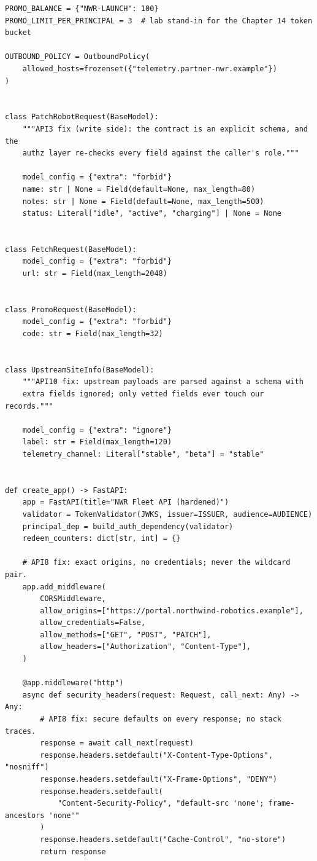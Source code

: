 \begin{verbatim}
PROMO_BALANCE = {"NWR-LAUNCH": 100}
PROMO_LIMIT_PER_PRINCIPAL = 3  # lab stand-in for the Chapter 14 token bucket

OUTBOUND_POLICY = OutboundPolicy(
    allowed_hosts=frozenset({"telemetry.partner-nwr.example"})
)


class PatchRobotRequest(BaseModel):
    """API3 fix (write side): the contract is an explicit schema, and the
    authz layer re-checks every field against the caller's role."""

    model_config = {"extra": "forbid"}
    name: str | None = Field(default=None, max_length=80)
    notes: str | None = Field(default=None, max_length=500)
    status: Literal["idle", "active", "charging"] | None = None


class FetchRequest(BaseModel):
    model_config = {"extra": "forbid"}
    url: str = Field(max_length=2048)


class PromoRequest(BaseModel):
    model_config = {"extra": "forbid"}
    code: str = Field(max_length=32)


class UpstreamSiteInfo(BaseModel):
    """API10 fix: upstream payloads are parsed against a schema with
    extra fields ignored; only vetted fields ever touch our records."""

    model_config = {"extra": "ignore"}
    label: str = Field(max_length=120)
    telemetry_channel: Literal["stable", "beta"] = "stable"


def create_app() -> FastAPI:
    app = FastAPI(title="NWR Fleet API (hardened)")
    validator = TokenValidator(JWKS, issuer=ISSUER, audience=AUDIENCE)
    principal_dep = build_auth_dependency(validator)
    redeem_counters: dict[str, int] = {}

    # API8 fix: exact origins, no credentials; never the wildcard pair.
    app.add_middleware(
        CORSMiddleware,
        allow_origins=["https://portal.northwind-robotics.example"],
        allow_credentials=False,
        allow_methods=["GET", "POST", "PATCH"],
        allow_headers=["Authorization", "Content-Type"],
    )

    @app.middleware("http")
    async def security_headers(request: Request, call_next: Any) -> Any:
        # API8 fix: secure defaults on every response; no stack traces.
        response = await call_next(request)
        response.headers.setdefault("X-Content-Type-Options", "nosniff")
        response.headers.setdefault("X-Frame-Options", "DENY")
        response.headers.setdefault(
            "Content-Security-Policy", "default-src 'none'; frame-ancestors 'none'"
        )
        response.headers.setdefault("Cache-Control", "no-store")
        return response


\end{verbatim}
